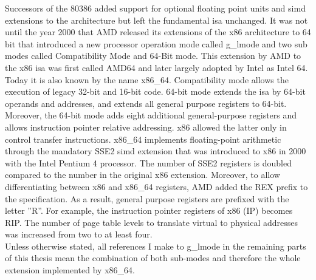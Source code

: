 Successors of the 80386 added support for optional floating point units and
\gls{simd} extensions to the architecture but left the fundamental
\gls{isa} unchanged. It was not until the year 2000 that AMD released its
extensions of the x86 architecture to 64 bit that introduced a new processor
operation mode called \gls{g_lmode} and two sub modes called
Compatibility Mode and 64-Bit mode. This extension by AMD to
the x86 \gls{isa} was first called AMD64 and later largely adopted by
Intel as Intel 64. Today it is also known by the name x86\_64. Compatibility
mode allows the execution of legacy 32-bit and 16-bit code. 64-bit mode extends
the \gls{isa} by 64-bit operands and addresses, and extends all general
purpose registers to 64-bit. Moreover, the 64-bit mode adds eight additional
general-purpose registers and allows instruction pointer relative addressing.
x86 allowed the latter only in control transfer instructions. x86\_64 implements
floating-point arithmetic through the mandatory SSE2 \gls{simd} extension
that was introduced to x86 in 2000 with the Intel Pentium 4 processor. The
number of SSE2 registers is doubled compared to the number in the original x86
extension. Moreover, to allow differentiating between x86 and x86\_64 registers,
AMD added the REX prefix to the specification. As a result, general purpose
registers are prefixed with the letter ''R''. For example, the instruction
pointer registers of x86 (IP) becomes RIP. The number of page table levels to
translate virtual to physical addresses was increased from two to at least
four.\\

Unless otherwise stated, all references I make to \gls{g_lmode} in the remaining
parts of this thesis mean the combination of both sub-modes and therefore the
whole extension implemented by x86\_64.

